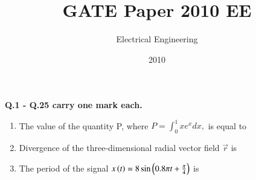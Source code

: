 \documentclass[12pt]{article}
\theoremstyle{remark}
\begin{document}
\title{\vspace{-5cm}GATE Paper 2010 EE}
\author{Electrical Engineering}
\date{2010}
\maketitle

\begin{flushleft}
\textbf{Q.1 - Q.25 carry one mark each.}
\end{flushleft}
\begin{enumerate}
\item The value of the quantity P, where $P=\int_{0}^{1}xe^{x}dx,$ is equal to
\begin{enumerate}
\end{enumerate}
\hfill{}

\item Divergence of the three-dimensional radial vector field $\vec{r}$ is
\begin{enumerate}
\end{enumerate}
\hfill{}

\item The period of the signal $x\left(t\right)=8\sin\left(0.8\pi t+\frac{\pi}{4}\right)$ is
\begin{enumerate}
\end{enumerate}
\hfill{}


\end{enumerate}
\end{document}
